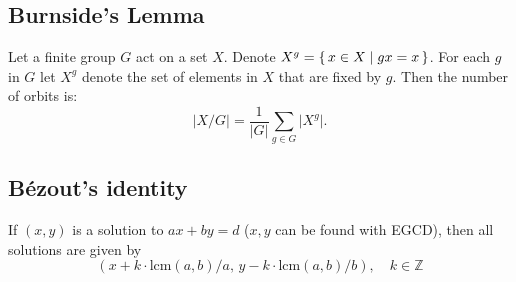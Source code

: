 \documentclass[8pt,a4paper,landscape,oneside]{amsart}
\begin{document}
\begin{multicols*}{3}
\subsection{Burnside's Lemma}
Let a finite group $G$ act on a set $X$.
Denote $X^g = \set{ x \in X | gx = x}$.
For each $g$ in $G$ let $X^g$ denote the set of elements in $X$ that are fixed by $g$.
Then the number of orbits is:
\begin{equation*}
	\lvert X/G \rvert = \frac{1}{\lvert G \rvert} \sum_{g\in G} \lvert X^g \rvert.
\end{equation*}

\subsection{Bézout's identity}
If $(x,y)$ is a solution to $ax+by=d$ ($x, y$ can be found with EGCD),
then all solutions are given by
\[
	\left( x + k \cdot \mathrm{lcm}(a,b) / a, \, y - k \cdot \mathrm{lcm}(a,b) / b \right), \quad k \in \mathbb{Z}
\]


\end{multicols*}
\end{document}
